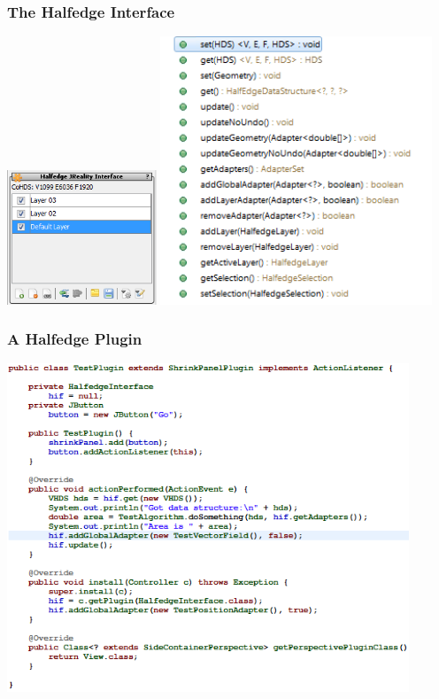 \documentclass[12pt]{beamer}
\begin{document}
\begin{frame}
\frametitle{The Halfedge Interface}
\includegraphics[height=4cm]{interface02.png}
\includegraphics[height=8cm]{interface.png}
\end{frame}

\begin{frame}
\frametitle{A Halfedge Plugin}
\begin{center}
\includegraphics[height=9.8cm]{testplugin.png}\\	
\end{center}
\end{frame}
\end{document}
